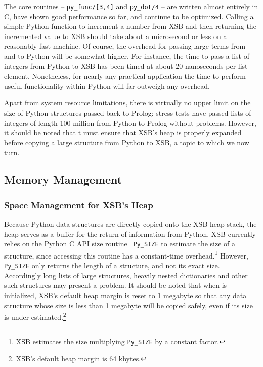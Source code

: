 
The core \janus{} routines -- {\tt py\_func/[3,4]} and {\tt py\_dot/4}
-- are written almost entirely in C, have shown good performance so
far, and continue to be optimized.  Calling a simple Python function
to increment a number from XSB and then returning the incremented
value to XSB should take about a microsecond or less on a reasonably
fast machine.  Of course, the overhead for passing large terms from
and to Python will be somewhat higher.  For instance, the time to pass
a list of integers from Python to XSB has been timed at about 20
nanoseconds per list element.  Nonetheless, for nearly any practical
application the time to perform useful functionality within Python
will far outweigh any \janus{} overhead.

Apart from system resource limitations, there is virtually no upper
limit on the size of Python structures passed back to Prolog: stress
tests have passed lists of integers of length 100 million from Python
to Prolog without problems. However, it should be noted that \janus{}t
must ensure that XSB's heap is properly expanded before copying a
large structure from Python to XSB, a topic to which we now turn.

\subsection{Memory Management} \label{sec:janus-memory}

\subsubsection{Space Management for XSB's Heap}
Because Python data structures are directly copied onto the XSB heap
stack, the heap serves as a buffer for the return of information from
Python.  XSB currently relies on the Python C API size routine {\tt
  Py\_SIZE} to estimate the size of a structure, since accessing this
routine has a constant-time overhead.\footnote{XSB estimates the size
  multiplying {\tt Py\_SIZE} by a constant factor.}  However, {\tt
  Py\_SIZE} only returns the length of a structure, and not its exact
size.  Accordingly long lists of large structures, heavily nested
dictionaries and other such structures may present a problem.  It
should be noted that when \janus{} is initialized, XSB's default
heap margin is reset to 1 megabyte so that any data structure whose
size is less than 1 megabyte will be copied safely, even if its size
is under-estimated.\footnote{XSB's default heap margin is 64 kbytes.}

